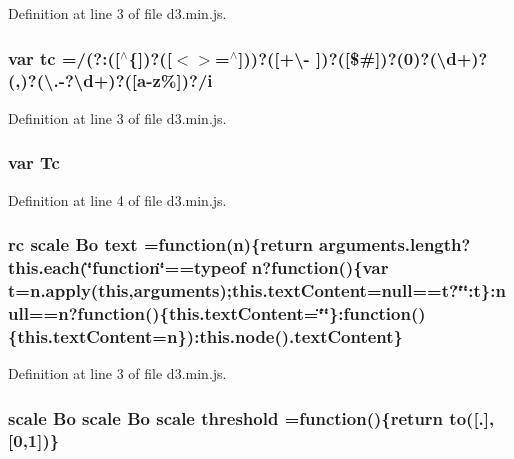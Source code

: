 Definition at line 3 of file d3.\+min.\+js.

\subsubsection[{tc}]{\setlength{\rightskip}{0pt plus 5cm}var tc =/(?\+:([$^\wedge$\{])?([$<$$>$=$^\wedge$]))?([+\textbackslash{}-\/ ])?([\$\#])?(0)?(\textbackslash{}{\bf d}+)?(,)?(\textbackslash{}.-\/?\textbackslash{}{\bf d}+)?([{\bf a}-\/z\%])?/{\bf i}}\label{d3_8min_8js_a2dbc0cca03b906ab6509f2b1bf731de3}


Definition at line 3 of file d3.\+min.\+js.

\subsubsection[{Tc}]{\setlength{\rightskip}{0pt plus 5cm}var Tc}\label{d3_8min_8js_a961fefd93bf399d67779281a97e2b1a3}


Definition at line 4 of file d3.\+min.\+js.

\subsubsection[{text}]{ {\bf rc} {\bf scale} {\bf Bo} text =function({\bf n})\{{\bf return} arguments.\+length?{\bf this.\+each}(\char`\"{}function\char`\"{}==typeof {\bf n}?function()\{var t=n.\+apply({\bf this},arguments);this.\+text\+Content=null==t?\char`\"{}\char`\"{}\+:t\}\+:null=={\bf n}?function()\{this.\+text\+Content=\char`\"{}\char`\"{}\}\+:function()\{this.\+text\+Content={\bf n}\})\+:{\bf this.\+node}().text\+Content\}}\label{d3_8min_8js_a5766b01c42864a326f9f41181fb631f4}


Definition at line 3 of file d3.\+min.\+js.

\subsubsection[{threshold}]{ {\bf scale} {\bf Bo} {\bf scale} {\bf Bo} {\bf scale} threshold =function()\{{\bf return} {\bf to}([.],[0,1])\}}\label{d3_8min_8js_ad0d41d21af0d7168dc80fbd3dcf52c32}


